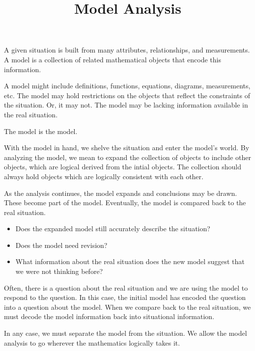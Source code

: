\documentclass{ximera}
\title{Model Analysis}
\begin{document}
\begin{abstract}
\end{abstract}
\maketitle






A given situation is built from many attributes, relationships, and measurements. A model is a collection of related mathematical objects that encode this information.

A model might include definitions, functions, equations, diagrams, measurements, etc. The model may hold restrictions on the objects that reflect the constraints of the situation.  Or, it may not. The model may be lacking information available in the real situation.

The model is the model.

With the model in hand, we shelve the situation and enter the model's world. By analyzing the model, we mean to expand the collection of objects to include other objects, which are logical derived from the intial objects.  The collection should always hold objects which are logically consistent with each other.

As the analysis continues, the model expands and conclusions may be drawn.  These become part of the model. Eventually, the model is compared back to the real situation.  



\begin{itemize}
\item Does the expanded model still accurately describe the situation?
\item Does the model need revision?
\item What information about the real situation does the new model suggest that we were not thinking before?
\end{itemize}


Often, there is a question about the real situation and we are using the model to respond to the question.  In this case, the initial model has encoded the question into a question about the model.  When we compare back to the real situation, we must decode the model information back into situational information.


In any case, we must separate the model from the situation.  We allow the model analysis to go wherever the mathematics logically takes it.
\end{document}
